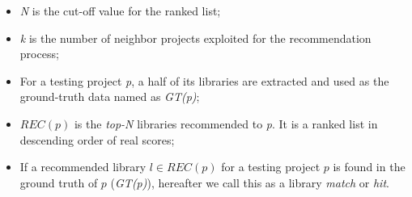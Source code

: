 \begin{itemize}[noitemsep,topsep=0pt]
	\item \emph{N} is the cut-off value for the ranked list;%
	\item \emph{k} is the number of neighbor projects exploited for the recommendation process;
	\item For a testing project \emph{p}, a half of its libraries are extracted and used as the ground-truth data named as \emph{GT(p)};
	\item $REC(p)$ is the \emph{top-N} libraries recommended to \emph{p}. It is a ranked list in descending order of real scores;%
	\item If a recommended library $l \in REC(p)$ for a testing project $p$ is found in the ground truth of $p$ (\ie \emph{GT(p)}), hereafter we call this as a library \textit{match} or \textit{hit}.	
\end{itemize}	





